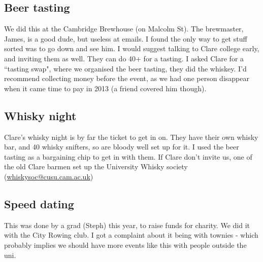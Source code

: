 \documentclass[9.5pt]{article} %
\begin{document}
\subsection{Beer tasting}
We did this at the Cambridge Brewhouse (on Malcolm St). The brewmaster, James, is a good dude, but useless at emails. I found the only way to get stuff sorted was to go down and see him. I would suggest talking to Clare college early, and inviting them as well. They can do 40+ for a tasting. I asked Clare for a ``tasting swap", where we organised the beer tasting, they did the whiskey. I'd recommend collecting money before the event, as we had one person disappear when it came time to pay in 2013 (a friend covered him though).
\subsection{Whisky night}
Clare's whisky night is by far the ticket to get in on. They have their own whisky bar, and 40 whisky snifters, so are bloody well set up for it. I used the beer tasting as a bargaining chip to get in with them. If Clare don't invite us, one of the old Clare barmen set up the University Whisky society (\href{mailto:whiskysoc@cusu.cam.ac.uk}{whiskysoc@cusu.cam.ac.uk})
\subsection{Speed dating}
This was done by a grad (Steph) this year, to raise funds for charity. We did it with the City Rowing club. I got a complaint about it being with townies - which probably implies we should have more events like this with people outside the uni.





\end{document}

